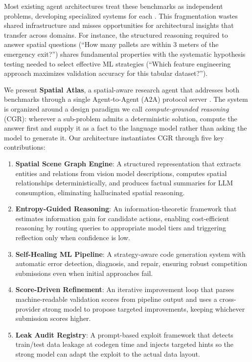 \documentclass[11pt]{article}
\begin{document}
Most existing agent architectures treat these benchmarks as independent problems, developing specialized systems for each \citep{yang2024sweagent, hong2024opendevin}. This fragmentation wastes shared infrastructure and misses opportunities for architectural insights that transfer across domains. For instance, the structured reasoning required to answer spatial questions (``How many pallets are within 3 meters of the emergency exit?'') shares fundamental properties with the systematic hypothesis testing needed to select effective ML strategies (``Which feature engineering approach maximizes validation accuracy for this tabular dataset?'').

We present \textbf{Spatial Atlas}, a spatial-aware research agent that addresses both benchmarks through a single Agent-to-Agent (A2A) protocol server \citep{google2024a2a}. The system is organized around a design paradigm we call \emph{compute-grounded reasoning} (CGR): wherever a sub-problem admits a deterministic solution, compute the answer first and supply it as a fact to the language model rather than asking the model to generate it. Our architecture instantiates CGR through five key contributions:

\begin{enumerate}[leftmargin=*,itemsep=2pt]
  \item \textbf{Spatial Scene Graph Engine}: A structured representation that extracts entities and relations from vision model descriptions, computes spatial relationships deterministically, and produces factual summaries for LLM consumption, eliminating hallucinated spatial reasoning.
  \item \textbf{Entropy-Guided Reasoning}: An information-theoretic framework that estimates information gain for candidate actions, enabling cost-efficient reasoning by routing queries to appropriate model tiers and triggering reflection only when confidence is low.
  \item \textbf{Self-Healing ML Pipeline}: A strategy-aware code generation system with automatic error detection, diagnosis, and repair, ensuring robust competition submissions even when initial approaches fail.
  \item \textbf{Score-Driven Refinement}: An iterative improvement loop that parses machine-readable validation scores from pipeline output and uses a cross-provider strong model to propose targeted improvements, keeping whichever submission scores higher.
  \item \textbf{Leak Audit Registry}: A prompt-based exploit framework that detects train/test data leakage at codegen time and injects targeted hints so the strong model can adapt the exploit to the actual data layout.
\end{enumerate}
\end{document}
